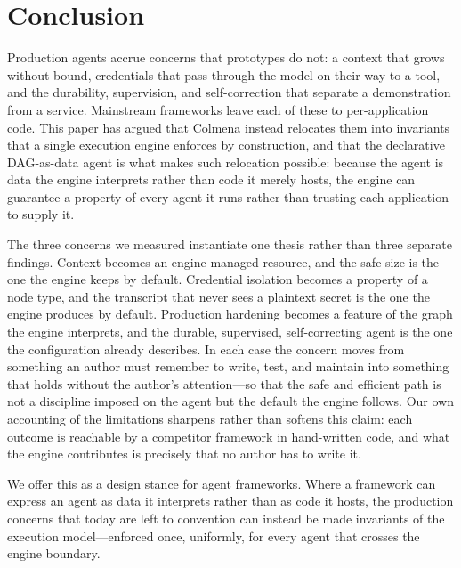 \section{Conclusion}
\label{sec:conclusion}

Production agents accrue concerns that prototypes do not: a context that
grows without bound, credentials that pass through the model on their way to
a tool, and the durability, supervision, and self-correction that separate a
demonstration from a service. Mainstream frameworks leave each of these to
per-application code. This paper has argued that Colmena instead relocates
them into invariants that a single execution engine enforces by
construction, and that the declarative DAG-as-data agent is what makes such
relocation possible: because the agent is data the engine interprets rather
than code it merely hosts, the engine can guarantee a property of every
agent it runs rather than trusting each application to supply it.

The three concerns we measured instantiate one thesis rather than three
separate findings. Context becomes an engine-managed resource, and the safe
size is the one the engine keeps by default. Credential isolation becomes a
property of a node type, and the transcript that never sees a plaintext
secret is the one the engine produces by default. Production hardening
becomes a feature of the graph the engine interprets, and the durable,
supervised, self-correcting agent is the one the configuration already
describes. In each case the concern moves from something an author must
remember to write, test, and maintain into something that holds without the
author's attention---so that the safe and efficient path is not a discipline
imposed on the agent but the default the engine follows. Our own accounting
of the limitations sharpens rather than softens this claim: each outcome is
reachable by a competitor framework in hand-written code, and what the
engine contributes is precisely that no author has to write it.

We offer this as a design stance for agent frameworks. Where a framework can
express an agent as data it interprets rather than as code it hosts, the
production concerns that today are left to convention can instead be made
invariants of the execution model---enforced once, uniformly, for every
agent that crosses the engine boundary.
